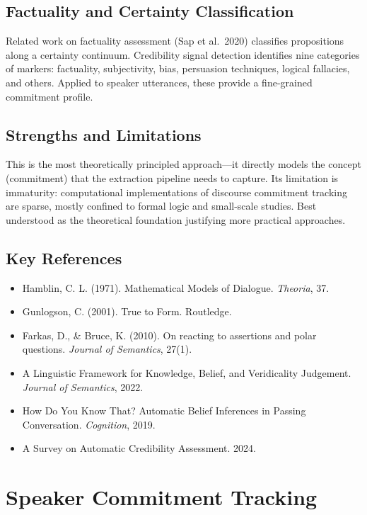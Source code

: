 \documentclass[11pt,letterpaper]{article}
\begin{document}
\subsection{Factuality and Certainty Classification}

Related work on factuality assessment (Sap et al.\ 2020) classifies propositions along a certainty continuum. Credibility signal detection identifies nine categories of markers: factuality, subjectivity, bias, persuasion techniques, logical fallacies, and others. Applied to speaker utterances, these provide a fine-grained commitment profile.

\subsection{Strengths and Limitations}

This is the most theoretically principled approach—it directly models the concept (commitment) that the extraction pipeline needs to capture. Its limitation is immaturity: computational implementations of discourse commitment tracking are sparse, mostly confined to formal logic and small-scale studies. Best understood as the theoretical foundation justifying more practical approaches.

\subsection{Key References}

\begin{itemize}
  \item Hamblin, C. L. (1971). Mathematical Models of Dialogue. \textit{Theoria}, 37.
  \item Gunlogson, C. (2001). True to Form. Routledge.
  \item Farkas, D., \& Bruce, K. (2010). On reacting to assertions and polar questions. \textit{Journal of Semantics}, 27(1).
  \item A Linguistic Framework for Knowledge, Belief, and Veridicality Judgement. \textit{Journal of Semantics}, 2022.
  \item How Do You Know That? Automatic Belief Inferences in Passing Conversation. \textit{Cognition}, 2019.
  \item A Survey on Automatic Credibility Assessment. 2024.
\end{itemize}

\section{Speaker Commitment Tracking}
\end{document}
